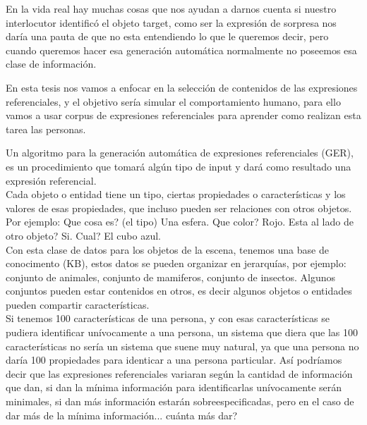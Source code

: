 En la vida real hay muchas cosas que nos ayudan a darnos cuenta si nuestro interlocutor identific\'o el objeto target, como ser la expresi\'on de sorpresa nos dar\'ia una pauta de que no esta entendiendo lo que le queremos decir, pero cuando queremos hacer esa generaci\'on autom\'atica normalmente no poseemos esa clase de informaci\'on.

En esta tesis nos vamos a enfocar en la selecci\'on de contenidos de las expresiones referenciales, y el objetivo ser\'ia simular el comportamiento humano, para ello vamos a usar corpus de expresiones referenciales para aprender como realizan esta tarea las personas.
 
Un algoritmo para la generaci\'on autom\'atica de expresiones referenciales (GER), es un procedimiento que tomar\'a alg\'un tipo de input y dar\'a como resultado una expresi\'on referencial.\\


Cada objeto o entidad tiene un tipo, ciertas propiedades o caracter\'isticas y los valores de esas propiedades, que incluso pueden ser relaciones con otros objetos. \\

Por ejemplo: Que cosa es? (el tipo) Una esfera. Que color? Rojo. Esta al lado de otro objeto? Si. Cual? El cubo azul.\\

Con esta clase de datos para los objetos de la escena, tenemos una base de conocimento (KB), estos datos se pueden organizar en jerarqu\'ias, por ejemplo: conjunto de animales, conjunto de mamiferos, conjunto de insectos. Algunos conjuntos pueden estar contenidos en otros, es decir algunos objetos o entidades pueden compartir caracter\'isticas.\\

Si tenemos 100 caracter\'isticas de una persona, y con esas caracter\'isticas se pudiera identificar un\'ivocamente a una persona, un sistema que diera que las 100 caracter\'isticas no ser\'ia un sistema que suene muy natural, ya que una persona no dar\'ia 100 propiedades para identicar a una persona particular. As\'i podr\'iamos decir que las expresiones referenciales variaran seg\'un la cantidad de informaci\'on que dan, si dan la m\'inima informaci\'on para identificarlas un\'ivocamente ser\'an minimales, si dan m\'as informaci\'on estar\'an sobreespecificadas, pero en el caso de dar m\'as de la m\'inima informaci\'on... cu\'anta m\'as dar?\\


